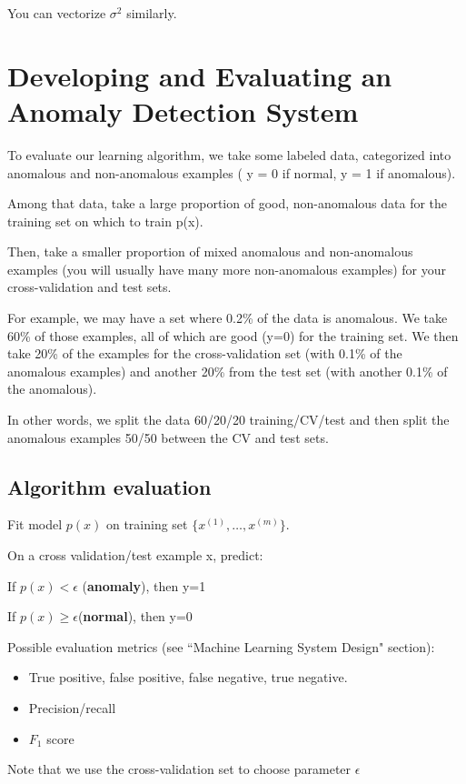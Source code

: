 You can vectorize $\sigma^2$ similarly.

\section{Developing and Evaluating an Anomaly Detection System}
To evaluate our learning algorithm, we take some labeled data, categorized into anomalous and non-anomalous examples ( y = 0 if normal, y = 1 if anomalous).

Among that data, take a large proportion of good, non-anomalous data for the training set on which to train p(x).

Then, take a smaller proportion of mixed anomalous and non-anomalous examples (you will usually have many more non-anomalous examples) for your cross-validation and test sets.

For example, we may have a set where 0.2\% of the data is anomalous. We take 60\% of those examples, all of which are good (y=0) for the training set. We then take 20\% of the examples for the cross-validation set (with 0.1\% of the anomalous examples) and another 20\% from the test set (with another 0.1\% of the anomalous).

In other words, we split the data 60/20/20 training/CV/test and then split the anomalous examples 50/50 between the CV and test sets.

\subsection{Algorithm evaluation}

Fit model $p(x)$ on training set $\lbrace x^{(1)},\dots,x^{(m)} \rbrace$.

On a cross validation/test example x, predict:

If $p(x) < \epsilon$ (\textbf{anomaly}), then y=1

If $p(x) \geq \epsilon $(\textbf{normal}), then y=0

Possible evaluation metrics (see ``Machine Learning System Design" section):

\begin{itemize}
\item True positive, false positive, false negative, true negative.
\item Precision/recall
\item $F_1$ score 
\end{itemize}

Note that we use the cross-validation set to choose parameter $\epsilon$

